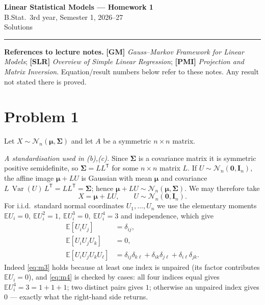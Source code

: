 \documentclass[11pt]{article}
\DeclareMathOperator{\Var}{Var}
\newcommand{\E}{\mathbb{E}}
\newcommand{\N}{\mathcal{N}}
\newcommand{\bI}{\mathbf{I}}
\newcommand{\bmu}{\bm{\mu}}
\newcommand{\bSig}{\bm{\Sigma}}
\newcommand{\T}{^{\mathsf{T}}}
\theoremstyle{remark}
\begin{document}
\begin{center}
	{\large\bfseries Linear Statistical Models --- Homework 1}\\[2pt]
	{\normalsize B.Stat.\ 3rd year, Semester 1, 2026--27}\\[2pt]
	{\small Solutions}
\end{center}

\hrule
\medskip

\noindent\textbf{References to lecture notes.}\;
\textbf{[GM]} \emph{Gauss--Markov Framework for Linear Models};\;
\textbf{[SLR]} \emph{Overview of Simple Linear Regression};\;
\textbf{[PMI]} \emph{Projection and Matrix Inversion}.
Equation/result numbers below refer to these notes. Any result not stated there is proved.

\bigskip

\section*{Problem 1}

Let $X\sim\N_n(\bmu,\bSig)$ and let $A$ be a symmetric $n\times n$ matrix.

\medskip
\noindent\emph{A standardisation used in (b),(c).}
Since $\bSig$ is a covariance matrix it is symmetric positive semidefinite, so $\bSig=LL\T$ for some
$n\times n$ matrix $L$. If $U\sim\N_n(\mathbf 0,\bI_n)$, the affine image $\bmu+LU$ is Gaussian with mean
$\bmu$ and covariance $L\,\Var(U)\,L\T=LL\T=\bSig$; hence $\bmu+LU\sim\N_n(\bmu,\bSig)$. We may therefore
take
\[
X=\bmu+LU,\qquad U\sim\N_n(\mathbf 0,\bI_n).
\]
For i.i.d.\ standard normal coordinates $U_1,\dots,U_n$ we use the elementary moments
$\E U_i=0,\ \E U_i^2=1,\ \E U_i^3=0,\ \E U_i^4=3$ and independence, which give
\begin{align}
\E[U_iU_j]&=\delta_{ij}, \label{eq:m2}\\
\E[U_iU_jU_k]&=0, \label{eq:m3}\\
\E[U_iU_jU_kU_\ell]&=\delta_{ij}\delta_{k\ell}+\delta_{ik}\delta_{j\ell}+\delta_{i\ell}\delta_{jk}.
\label{eq:m4}
\end{align}
Indeed \eqref{eq:m3} holds because at least one index is unpaired (its factor contributes $\E U_i=0$), and
\eqref{eq:m4} is checked by cases: all four indices equal gives $\E U_i^4=3=1+1+1$; two distinct pairs gives
$1$; otherwise an unpaired index gives $0$ --- exactly what the right-hand side returns.

\end{document}
